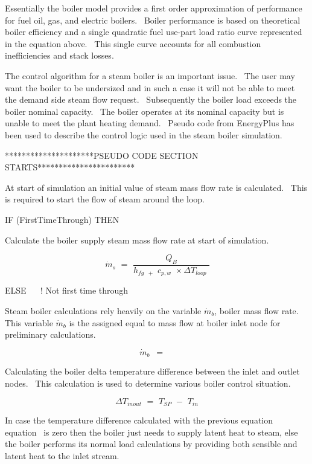 Essentially the boiler model provides a first order approximation of performance for fuel oil, gas, and electric boilers.~ Boiler performance is based on theoretical boiler efficiency and a single quadratic fuel use-part load ratio curve represented in the equation above.~ This single curve accounts for all combustion inefficiencies and stack losses.

The control algorithm for a steam boiler is an important issue.~ The user may want the boiler to be undersized and in such a case it will not be able to meet the demand side steam flow request.~ Subsequently the boiler load exceeds the boiler nominal capacity.~ The boiler operates at its nominal capacity but is unable to meet the plant heating demand.~ Pseudo code from EnergyPlus has been used to describe the control logic used in the steam boiler simulation.

*********************PSEUDO CODE SECTION STARTS***********************

At start of simulation an initial value of steam mass flow rate is calculated.~ This is required to start the flow of steam around the loop.

IF (FirstTimeThrough) THEN

Calculate the boiler supply steam mass flow rate at start of simulation.

\begin{equation}
\,{\dot m_s}\,\, = \,\,\frac{{{Q_B}}}{{{h_{fg\,\,\, + }}\,\,{c_{p,w}}\,\, \times \Delta {T_{loop}}\,\,}}
\end{equation}

ELSE ~~ ! Not first time through

Steam boiler calculations rely heavily on the variable \(\dot m\)\(_{b}\), boiler mass flow rate.~ This variable \(\dot m_{b}\) is the assigned equal to mass flow at boiler inlet node for preliminary calculations.

\begin{equation}
\,{\dot m_b}\,\,\, = \,\,\,\mathop {\,{{\dot m}_{InletNode}}}\limits^{}
\end{equation}

Calculating the boiler delta temperature difference between the inlet and outlet nodes.~ This calculation is used to determine various boiler control situation.

\begin{equation}
\Delta {T_{inout}}\,\, = \,\,{T_{SP}}\,\, - \,\,{T_{in}}
\end{equation}

In case the temperature difference calculated with the previous equation equation~ is zero then the boiler just needs to supply latent heat to steam, else the boiler performs its normal load calculations by providing both sensible and latent heat to the inlet stream.

